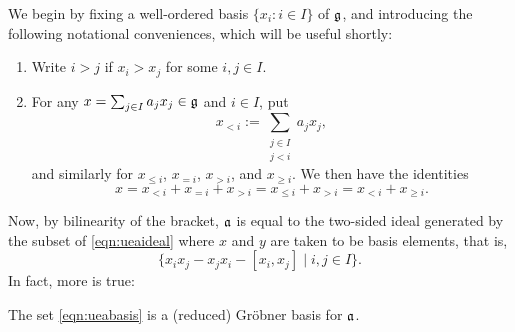 We begin by fixing a well-ordered basis $\{x_i:i\in I\}$ of $\mathfrak{g}$, and introducing the following notational conveniences, which will be useful shortly:
\begin{notation}
\begin{enumerate}
\item Write $i>j$ if $x_i>x_j$ for some $i,j\in I$.
\item For any $x=\sum_{j\in I}a_jx_j\in\mathfrak{g}$ and $i\in I$, put
\begin{equation*}
x_{<i}:=\sum_{\substack{j\in I\\j<i}}a_jx_j,
\end{equation*}
and similarly for $x_{\le i}$, $x_{=i}$, $x_{>i}$, and $x_{\ge i}$. We then have the identities
\begin{equation*}
x=x_{<i}+x_{=i}+x_{>i}=x_{\le i}+x_{>i}=x_{<i}+x_{\ge i}.
\end{equation*}

\end{enumerate}
\end{notation}
Now, by bilinearity of the bracket, $\mathfrak{a}$ is equal to the two-sided ideal generated by the subset of \eqref{eqn:ueaideal} where $x$ and $y$ are taken to be basis elements, that is,
\begin{equation}
\label{eqn:ueabasis}
\{x_ix_j-x_jx_i-[x_i,x_j]\mid i,j\in I\}.
\end{equation}
In fact, more is true:
\begin{lem}
\label{lem:ueagrobner}
The set \eqref{eqn:ueabasis} is a (reduced) Gr\"obner basis for $\mathfrak{a}$.
\end{lem}

